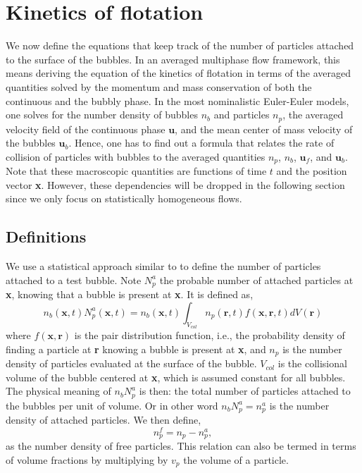 \section{Kinetics of flotation}
\label{sec:efficiency}
We now define the equations that keep track of the number of particles attached to the surface of the bubbles.
In an averaged multiphase flow framework, this means deriving the equation of the kinetics of flotation in terms of the averaged quantities solved by the momentum and mass conservation of both the continuous and the bubbly phase.
In the most nominalistic Euler-Euler models, one solves for the number density of bubbles $n_b$ and particles $n_p$, the averaged velocity field of the continuous phase $\textbf{u}$, and the mean center of mass velocity of the bubbles $\textbf{u}_b$.
Hence,  one has to find out a formula that relates the rate of collision of particles with bubbles to the averaged quantities $n_p$, $n_b$, $\textbf{u}_f$, and $\textbf{u}_b$. 
Note that these macroscopic quantities are functions of time $t$ and the position vector \textbf{x}.
However, these dependencies will be dropped in the following section since we only focus on statistically homogeneous flows.

\subsection{Definitions}

We use a statistical approach similar to \citet{roure2021modelling} to define the number of particles attached to a test bubble.
Note $N_p^a$ the probable number of attached particles at \textbf{x}, knowing that a bubble is present at \textbf{x}.
It is defined as,
\begin{equation}
    n_b(\textbf{x},t) N_p^a(\textbf{x},t) = n_b(\textbf{x},t)\int_{V_{col}} n_p(\textbf{r},t) f(\textbf{x},\textbf{r},t) dV(\textbf{r})
    \label{eq:Npa}
\end{equation}
where $f(\textbf{x},\textbf{r})$ is the pair distribution function, i.e., the probability density of finding a particle at \textbf{r} knowing a bubble is present at \textbf{x}, and $n_p$ is the number density of particles evaluated at the surface of the bubble. 
$V_{col}$ is the collisional volume of the bubble centered at \textbf{x}, which is assumed constant for all bubbles. 
The physical meaning of $n_b N_p^a$ is then: the total number of particles attached to the bubbles per unit of volume. 
Or in other word $n_bN_p^a = n_p^a$ is the number density of attached particles. 
We then define, 
\begin{equation}
    n_p^f= n_p - n_p^a,
\end{equation}
as the number density of free particles. 
This relation can also be termed in terms of volume fractions by multiplying  by $v_p$ the volume of a particle. 


